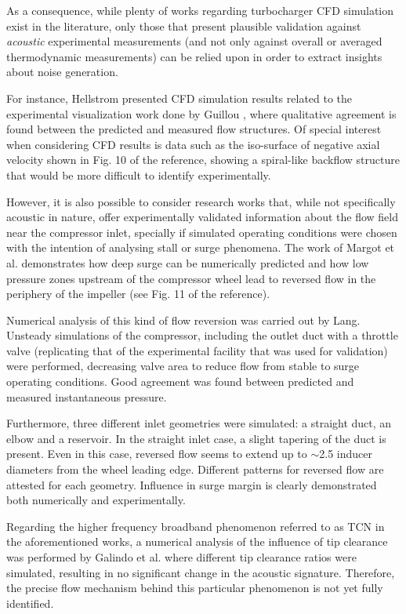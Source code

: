 As a consequence, while plenty of works regarding turbocharger CFD simulation exist in the literature, only those that present plausible validation against \emph{acoustic} experimental measurements (and not only against overall or averaged thermodynamic measurements) can be relied upon in order to extract insights about noise generation.

For instance, Hellstrom \cite{hellstrom2010stall} presented CFD simulation results related to the experimental visualization work done by Guillou \cite{guillou2011flow}, where qualitative agreement is found between the predicted and measured flow structures. Of special interest when considering CFD results is data such as the iso-surface of negative axial velocity shown in Fig. 10 of the reference, showing a spiral-like backflow structure that would be more difficult to identify experimentally.

However, it is also possible to consider research works that, while not specifically acoustic in nature, offer experimentally validated information about the flow field near the compressor inlet, specially if simulated operating conditions were chosen with the intention of analysing stall or surge phenomena. The work of Margot et al. \cite{margot2008combination} demonstrates how deep surge can be numerically predicted and how low pressure zones upstream of the compressor wheel lead to reversed flow in the periphery of the impeller (see Fig. 11 of the reference).

Numerical analysis of this kind of flow reversion was carried out by Lang\cite{lang2011contribucion}. Unsteady simulations of the compressor, including the outlet duct with a throttle valve (replicating that of the experimental facility that was used for validation) were performed, decreasing valve area to reduce flow from stable to surge operating conditions. Good agreement was found between predicted and measured instantaneous pressure. 

Furthermore, three different inlet geometries were simulated: a straight duct, an elbow and a reservoir. In the straight inlet case, a slight tapering of the duct is present. Even in this case, reversed flow seems to extend up to $\sim$2.5 inducer diameters from the wheel leading edge. Different patterns for reversed flow are attested for each geometry. Influence in surge margin is clearly demonstrated both numerically and experimentally.

Regarding the higher frequency broadband phenomenon referred to as TCN in the aforementioned works, a numerical analysis of the influence of tip clearance was performed by Galindo et al. \cite{galindo2014influence} where different tip clearance ratios were simulated, resulting in no significant change in the acoustic signature. Therefore, the precise flow mechanism behind this particular phenomenon is not yet fully identified.

